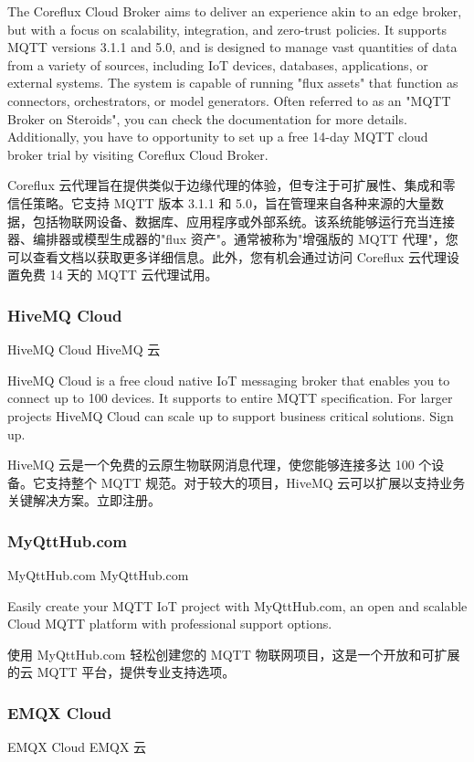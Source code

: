 \documentclass{ctexbook}
\begin{document}
The Coreflux Cloud Broker aims to deliver an experience akin to an edge broker, but with a focus on scalability, integration, and zero-trust policies. It supports MQTT versions 3.1.1 and 5.0, and is designed to manage vast quantities of data from a variety of sources, including IoT devices, databases, applications, or external systems. The system is capable of running "flux assets" that function as connectors, orchestrators, or model generators. Often referred to as an "MQTT Broker on Steroids", you can check the documentation for more details. Additionally, you have to opportunity to set up a free 14-day MQTT cloud broker trial by visiting Coreflux Cloud Broker.

Coreflux 云代理旨在提供类似于边缘代理的体验，但专注于可扩展性、集成和零信任策略。它支持 MQTT 版本 3.1.1 和 5.0，旨在管理来自各种来源的大量数据，包括物联网设备、数据库、应用程序或外部系统。该系统能够运行充当连接器、编排器或模型生成器的"flux 资产"。通常被称为"增强版的 MQTT 代理"，您可以查看文档以获取更多详细信息。此外，您有机会通过访问 Coreflux 云代理设置免费 14 天的 MQTT 云代理试用。

\subsubsection{HiveMQ Cloud}
HiveMQ Cloud HiveMQ 云

HiveMQ Cloud is a free cloud native IoT messaging broker that enables you to connect up to 100 devices. It supports to entire MQTT specification. For larger projects HiveMQ Cloud can scale up to support business critical solutions. Sign up.

HiveMQ 云是一个免费的云原生物联网消息代理，使您能够连接多达 100 个设备。它支持整个 MQTT 规范。对于较大的项目，HiveMQ 云可以扩展以支持业务关键解决方案。立即注册。

\subsubsection{MyQttHub.com}
MyQttHub.com MyQttHub.com

Easily create your MQTT IoT project with MyQttHub.com, an open and scalable Cloud MQTT platform with professional support options.

使用 MyQttHub.com 轻松创建您的 MQTT 物联网项目，这是一个开放和可扩展的云 MQTT 平台，提供专业支持选项。

\subsubsection{EMQX Cloud}
EMQX Cloud EMQX 云
\end{document}
